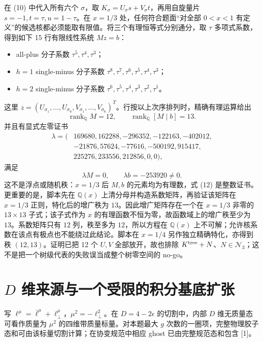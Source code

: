 \documentclass[UTF8,11pt]{ctexart}
\newcommand{\cN}{\mathcal N}
\newcommand{\eps}{\epsilon}
\begin{document}
在 (10) 中代入所有六个 $\sigma$，取
$K_\sigma=U_\sigma s+V_\sigma t$，再用自旋量片
$s=-1,t=\tau,u=1-\tau$。在 $x=1/3$ 处，任何符合题面“对全部 $0<x<1$ 有定义”的候选核都必须能取有限值。将三个有理恒等式分别通分，取 $\tau$ 多项式系数，得到如下 15 行有限线性系统 $M z=b$：
\begin{itemize}
\item all-plus 分子系数 $\tau^5,\tau^4,\tau^3$；
\item $h=1$ single-minus 分子系数 $\tau^8,\tau^7,\tau^6,\tau^5,\tau^4,\tau^3$；
\item $h=2$ single-minus 分子系数 $\tau^6,\tau^5,\tau^4,\tau^3,\tau^2,\tau^1$。
\end{itemize}
这里 $z=(U_{\sigma_1},\ldots,U_{\sigma_6},V_{\sigma_1},\ldots,V_{\sigma_6})^T$。行按以上次序排列时，精确有理运算给出
\[
\operatorname{rank}_{\mathbb Q}M=12,
\qquad \operatorname{rank}_{\mathbb Q}[M\mid b]=13.
\tag{11}
\]
并且有显式左零证书
\[
\begin{aligned}
\lambda=(&169680,162288,-296352,-122163,-402012,\\
         &-21876,57624,-77616,-500192,915417,\\
         &225276,233556,212856,0,0),
\end{aligned}
\]
满足
\[
\lambda M=0,\qquad \lambda b=-253920\ne0.
\tag{12}
\]
这不是浮点或随机秩：$x=1/3$ 后 $M,b$ 的元素均为有理数，式 (12) 是整数证书。更重要的是，脚本先在 $\mathbb Q(x)$ 上清分母并构造系数矩阵，再验证该矩阵在 $x=1/3$ 正则，特化后的增广秩为 $13$。因此增广矩阵存在一个在 $x=1/3$ 非零的 $13\times13$ 子式；该子式作为 $x$ 的有理函数不恒为零，故函数域上的增广秩至少为 $13$。系数矩阵只有 $12$ 列，秩至多为 $12$，所以方程在 $\mathbb Q(x)$ 上不可解；允许核系数在该点有极点也不能绕过此结论。脚本在 $x=1/4$ 另作独立精确特化，亦得到秩 $(12,13)$。证明已把 12 个 $U,V$ 全部放开，故也排除 $K^{\rm tree}+N$、$N\in\cN_3$；这不是把一个树级代表的失败误当成整个树零空间的 no-go。

\section{\texorpdfstring{$D$}{D} 维来源与一个受限的积分基底扩张}
写 $\ell^\mu=\bar\ell^\mu+\ell_\perp^\mu$，$\mu^2=-\ell_\perp^2$。在 $D=4-2\eps$ 的切割中，内部 $D$ 维无质量态可看作质量为 $\mu^2$ 的四维带质量标量。对本题最大 $g$ 次数的一圈项，完整物理胶子态和可由该标量切割计算；在协变规范中相应 ghost 已由完整规范态和包含 [1]。
\end{document}
